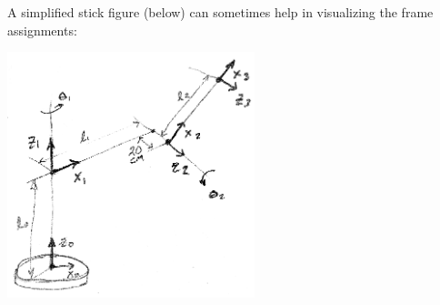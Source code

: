 \begin{ExampleCont}
A simplified stick figure (below) can sometimes help in visualizing the frame assignments:

\includegraphics[width=72mm]{figs03/00885.eps}

\end{ExampleCont}
%
%
